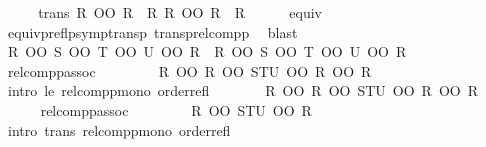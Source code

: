 \begin{isabellebody}
\ {\isacharminus}{\kern0pt}\isanewline
\ \ \isamarkupfalse%
\ trans{\isacharcolon}{\kern0pt}\ {\isachardoublequoteopen}R\ OO\ R\ {\isasymle}\ R{\isachardoublequoteclose}\ {\isachardoublequoteopen}R{\isacharprime}{\kern0pt}\ OO\ R{\isacharprime}{\kern0pt}\ {\isasymle}\ R{\isacharprime}{\kern0pt}{\isachardoublequoteclose}\isanewline
\ \ \ \ \isamarkupfalse%
\ equiv\ \isamarkupfalse%
\ equivp{\isacharunderscore}{\kern0pt}reflp{\isacharunderscore}{\kern0pt}symp{\isacharunderscore}{\kern0pt}transp\ transp{\isacharunderscore}{\kern0pt}relcompp\ \isamarkupfalse%
\ blast{\isacharplus}{\kern0pt}\isanewline
\ \ \isamarkupfalse%
\ {\isachardoublequoteopen}R\ OO\ S\ OO\ T\ OO\ U\ OO\ R{\isacharprime}{\kern0pt}\ {\isacharequal}{\kern0pt}\ R\ OO\ {\isacharparenleft}{\kern0pt}S\ OO\ T\ OO\ U{\isacharparenright}{\kern0pt}\ OO\ R{\isacharprime}{\kern0pt}{\isachardoublequoteclose}\isanewline
\ \ \ \ \isamarkupfalse%
\ relcompp{\isacharunderscore}{\kern0pt}assoc\ \isacommand{{\isachardot}{\kern0pt}{\isachardot}{\kern0pt}}\isamarkupfalse%
\isanewline
\ \ \isamarkupfalse%
\ \isamarkupfalse%
\ {\isachardoublequoteopen}{\isasymdots}\ {\isasymle}\ R\ OO\ {\isacharparenleft}{\kern0pt}R\ OO\ STU\ OO\ R{\isacharprime}{\kern0pt}{\isacharparenright}{\kern0pt}\ OO\ R{\isacharprime}{\kern0pt}{\isachardoublequoteclose}\isanewline
\ \ \ \ \isamarkupfalse%
\ {\isacharparenleft}{\kern0pt}intro\ le\ relcompp{\isacharunderscore}{\kern0pt}mono\ order{\isacharunderscore}{\kern0pt}refl{\isacharparenright}{\kern0pt}\isanewline
\ \ \isamarkupfalse%
\ \isamarkupfalse%
\ {\isachardoublequoteopen}{\isasymdots}\ {\isasymle}\ {\isacharparenleft}{\kern0pt}R\ OO\ R{\isacharparenright}{\kern0pt}\ OO\ STU\ OO\ {\isacharparenleft}{\kern0pt}R{\isacharprime}{\kern0pt}\ OO\ R{\isacharprime}{\kern0pt}{\isacharparenright}{\kern0pt}{\isachardoublequoteclose}\isanewline
\ \ \ \ \isamarkupfalse%
\ relcompp{\isacharunderscore}{\kern0pt}assoc\ \isacommand{{\isachardot}{\kern0pt}{\isachardot}{\kern0pt}}\isamarkupfalse%
\isanewline
\ \ \isamarkupfalse%
\ \isamarkupfalse%
\ {\isachardoublequoteopen}{\isasymdots}\ {\isasymle}\ R\ OO\ STU\ OO\ R{\isacharprime}{\kern0pt}{\isachardoublequoteclose}\isanewline
\ \ \ \ \isamarkupfalse%
\ {\isacharparenleft}{\kern0pt}intro\ trans\ relcompp{\isacharunderscore}{\kern0pt}mono\ order{\isacharunderscore}{\kern0pt}refl{\isacharparenright}{\kern0pt}\isanewline

\end{isabellebody}
